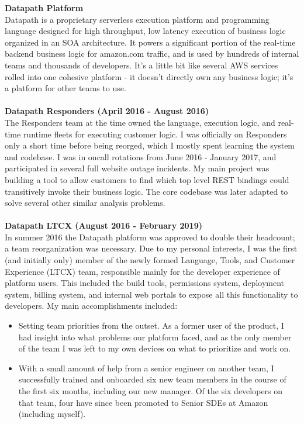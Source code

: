 \documentclass{res}
\begin{document}
\begin{resume}
   {\large \bf Datapath Platform }\\
   Datapath is a proprietary serverless execution platform and programming language designed for high throughput, low latency execution of business logic organized in an SOA architecture.  It powers a significant portion of the real-time backend business logic for amazon.com traffic, and is used by hundreds of internal teams and thousands of developers.  It's a little bit like several AWS services rolled into one cohesive platform - it doesn't directly own any business logic; it's a platform for other teams to use.\\
   \\
   {\bf Datapath Responders (April 2016 - August 2016) }\\
   The Responders team at the time owned the language, execution logic, and real-time runtime fleets for executing customer logic.  I was officially on Responders only a short time before being reorged, which I mostly spent learning the system and codebase.  I was in oncall rotations from June 2016 - January 2017, and participated in several full website outage incidents.  My main project was building a tool to allow customers to find which top level REST bindings could transitively invoke their business logic.  The core codebase was later adapted to solve several other similar analysis problems.\\
   \\
   {\bf Datapath LTCX (August 2016 - February 2019) }\\
   In summer 2016 the Datapath platform was approved to double their headcount; a team reorganization was necessary.  Due to my personal interests, I was the first (and initially only) member of the newly formed Language, Tools, and Customer Experience (LTCX) team, responsible mainly for the developer experience of platform users.  This included the build tools, permissions system, deployment system, billing system, and internal web portals to expose all this functionality to developers.  My main accomplishments included:
   \begin{itemize}
   \item Setting team priorities from the outset.  As a former user of the product, I had insight into what problems our platform faced, and as the only member of the team I was left to my own devices on what to prioritize and work on.
	\item With a small amount of help from a senior engineer on another team, I successfully trained and onboarded six new team members in the course of the first six months, including our new manager.  Of the six developers on that team, four have since been promoted to Senior SDEs at Amazon (including myself).

\end{itemize}
\end{resume}
\end{document}
